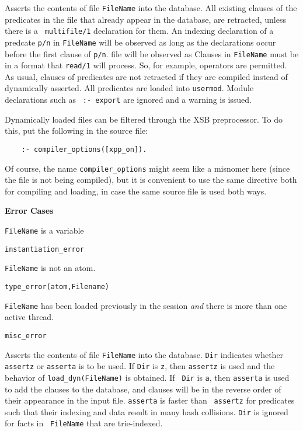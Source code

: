 \begin{description}
\label{load_dyn/1}
    Asserts the contents of file {\tt FileName} into the database.
    All existing clauses of the predicates in the file that already
    appear in the database, are retracted, unless there is a {\tt
    multifile/1} declaration for them.  An indexing declaration of a
    predcate {\tt p/n} in {\tt FileName} will be observed as long as
    the declarations occur before the first clause of {\tt p/n}.  file
    will be observed as Clauses in {\tt FileName} must be in a format
    that {\tt read/1} will process.  So, for example, operators are
    permitted.  As usual, clauses of predicates are not retracted if
    they are compiled instead of dynamically asserted.  All predicates
    are loaded into {\tt usermod}.  Module declarations such as {\tt
    :- export} are ignored and a warning is issued.

    Dynamically loaded files can be filtered through the XSB preprocessor.
    To do this, put the following in the source file: 
    \begin{verbatim}
    :- compiler_options([xpp_on]).      
    \end{verbatim}

    Of course, the name \verb|compiler_options| might seem like a misnomer
    here (since the file is not being compiled), but it is convenient to
    use the same directive both for compiling and loading, in case the same
    source file is used both ways.

{\bf Error Cases}
\bi
\item 	{\tt FileName} is a variable
 \bi
 \item 	{\tt instantiation\_error}
 \ei
\item 	{\tt FileName} is not an atom.
 \bi
 \item 	{\tt type\_error(atom,Filename)}
 \ei
\item {\tt FileName} has been loaded previously in the session {\em and}
  there is more than one active thread.  
 \bi
 \item 	{\tt misc\_error}
 \ei
%
\ei

\label{load_dyn/2}
    Asserts the contents of file {\tt FileName} into the database.
    {\tt Dir} indicates whether {\tt assertz} or {\tt asserta} is to
    be used.  If {\tt Dir} is {\tt z}, then {\tt assertz} is used and
    the behavior of {\tt load\_dyn(FileName)} is obtained.  If {\tt
    Dir} is {\tt a}, then {\tt asserta} is used to add the clauses to
    the database, and clauses will be in the reverse order of their
    appearance in the input file.  {\tt asserta} is faster than {\tt
    assertz} for predicates such that their indexing and data result
    in many hash collisions.  {\tt Dir} is ignored for facts in {\tt
    FileName} that are trie-indexed.


\end{description}
